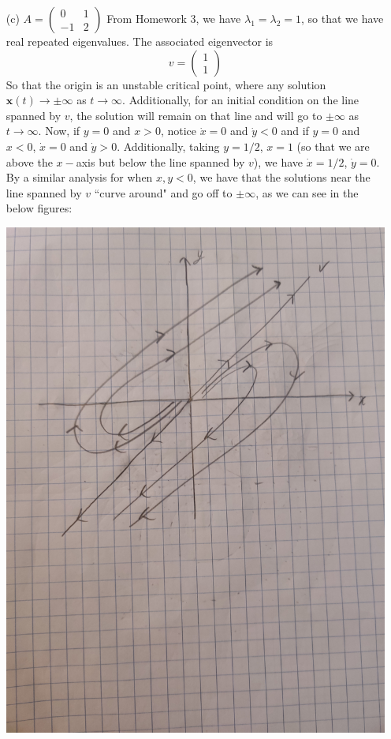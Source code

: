 \documentclass{article}
\begin{document}
\begin{itemize}
\begin{itemize}
        \item[(c)] $A = \begin{pmatrix}
            0 & 1\\
            -1 & 2
        \end{pmatrix}$
        \newline\newline
        From Homework 3, we have $\lambda_1 = \lambda_2 = 1$, so that we have real repeated eigenvalues. The associated eigenvector is
        \[v = \begin{pmatrix}
            1\\
            1
        \end{pmatrix}\]
        So that the origin is an unstable critical point, where any solution $\mathbf{x}(t) \to \pm\infty$ as $t \to \infty$. Additionally, for an initial condition on the line spanned by $v$, the solution will remain on that line and will go to $\pm \infty$ as $t \to \infty$.
        \newline
        Now, if $y = 0$ and $x > 0$, notice $\dot{x} = 0$ and $\dot{y} < 0$ and if $y = 0$ and $x < 0$, $\dot{x} = 0$ and $\dot{y} > 0$. Additionally, taking $y = 1/2$, $x = 1$ (so that we are above the $x-$axis but below the line spanned by $v$), we have $\dot{x} = 1/2$, $\dot{y} = 0$. By a similar analysis for when $x,y < 0$, we have that the solutions near the line spanned by $v$ ``curve around" and go off to $\pm \infty$, as we can see in the below figures:
        \begin{center}
            \includegraphics[scale = 0.05]{prob1c_sketch.jpg}

\end{center}
\end{itemize}
\end{itemize}
\end{document}
